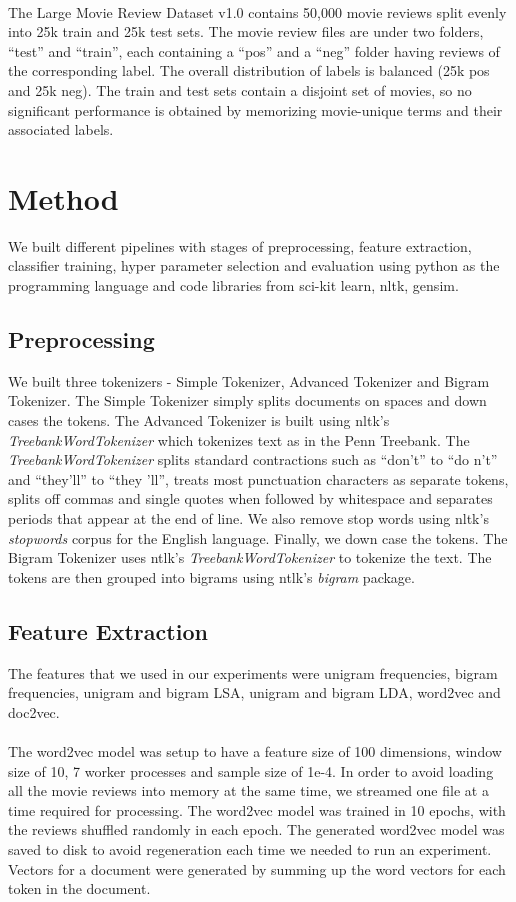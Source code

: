 \documentclass[11pt, oneside]{article}
\begin{document}
\paragraph{} 
The Large Movie Review Dataset v1.0 contains 50,000 movie reviews split evenly into 25k train and 25k test sets. The movie review files are under two folders, ``test'' and ``train'', each containing a ``pos'' and a ``neg'' folder having reviews of the corresponding label. The overall distribution of labels is balanced (25k pos and 25k neg). The train and test sets contain a disjoint set of movies, so no significant performance is obtained by memorizing movie-unique terms and their associated labels.
\section{Method}
We built different pipelines with stages of preprocessing, feature extraction, classifier training, hyper parameter selection and evaluation using python as the programming language and code libraries from sci-kit learn, nltk, gensim.
\subsection{Preprocessing}
We built three tokenizers - Simple Tokenizer, Advanced Tokenizer and Bigram Tokenizer. The Simple Tokenizer simply splits documents on spaces and down cases the tokens. The Advanced Tokenizer is built using nltk's \textit{TreebankWordTokenizer} which tokenizes text as in the Penn Treebank. The \textit{TreebankWordTokenizer} splits standard contractions such as ``don't'' to ``do n't'' and ``they'll'' to ``they 'll'', treats most punctuation characters as separate tokens, splits off commas and single quotes when followed by whitespace and separates periods that appear at the end of line. We also remove stop words using nltk's \textit{stopwords} corpus for the English language. Finally, we down case the tokens. The Bigram Tokenizer uses ntlk's \textit{TreebankWordTokenizer} to tokenize the text. The tokens are then grouped into bigrams using ntlk's \textit{bigram} package.
\subsection{Feature Extraction}
The features that we used in our experiments were unigram frequencies, bigram frequencies, unigram and bigram LSA, unigram and bigram LDA, word2vec and doc2vec.
\paragraph{}
The word2vec model was setup to have a feature size of 100 dimensions, window size of 10, 7 worker processes and sample size of 1e-4. In order to avoid loading all the movie reviews into memory at the same time, we streamed one file at a time required for processing. The word2vec model was trained in 10 epochs, with the reviews shuffled randomly in each epoch. The generated word2vec model was saved to disk to avoid regeneration each time we needed to run an experiment. Vectors for a document were generated by summing up the word vectors for each token in the document.
\end{document}
